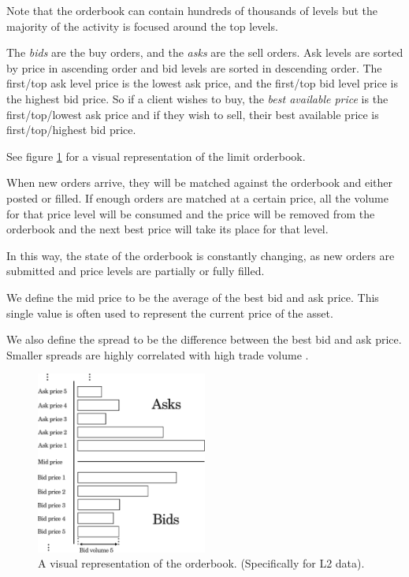 \documentclass[a4paper, oneside, notitlepage]{book}
\begin{document}
Note that the orderbook can contain hundreds of thousands of levels but the majority
of the activity is focused around the top levels.

The \textit{bids} are the buy orders, and the \textit{asks}
are the sell orders. Ask levels are sorted by price in ascending order and 
bid levels are sorted in descending order. The first/top ask level price is the
lowest ask price, and the first/top bid level price is the highest bid price. 
So if a client wishes to buy, the \textit{best available price} is the first/top/lowest ask price
and if they wish to sell, their best available price is first/top/highest bid price.

See figure \ref{fig:orderbook} for a visual representation of the limit orderbook.

When new orders arrive, they will be matched against the orderbook and either posted or filled.
If enough orders are matched at a certain price, all the volume for that price level 
will be consumed and the price will be removed from the orderbook and the next best price will take its place for that level.

In this way, the state of the orderbook is constantly changing, as new orders are submitted
and price levels are partially or fully filled.

We define the mid price to be the average of the best bid and ask price.
This single value is often used to represent the current price of the asset.

We also define the spread to be the difference between the best bid and ask price.
Smaller spreads are highly correlated with high trade volume \cite{ARITRA2021}.

\begin{figure}[htpb]
    \centering
    \includegraphics[width=0.5\textwidth]{./images/orderbook.pdf}
    \caption{A visual representation of the orderbook. (Specifically for L2 data).}
    \label{fig:orderbook}
\end{figure}
\end{document}
